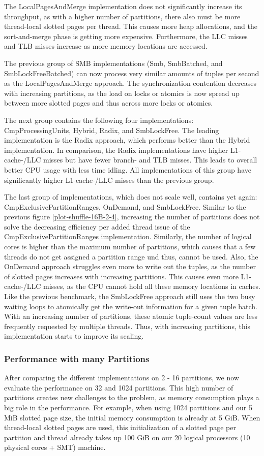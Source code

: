 The LocalPagesAndMerge implementation does not significantly increase its throughput, as with a higher number of partitions, there also must be more thread-local slotted pages per thread.
This causes more heap allocations, and the sort-and-merge phase is getting more expensive.
Furthermore, the \ac{LLC} misses and \ac{TLB} misses increase as more memory locations are accessed.

The previous group of SMB implementations (Smb, SmbBatched, and SmbLockFreeBatched) can now process very similar amounts of tuples per second as the LocalPagesAndMerge approach.
The synchronization contention decreases with increasing partitions, as the load on locks or atomics is now spread up between more slotted pages and thus across more locks or atomics.

The next group contains the following four implementations: CmpProcessingUnits, Hybrid, Radix, and SmbLockFree.
The leading implementation is the Radix approach, which performs better than the Hybrid implementation.
In comparison, the Radix implementations have higher L1-cache-/LLC misses but have fewer branch- and TLB misses.
This leads to overall better CPU usage with less time idling.
All implementations of this group have significantly higher L1-cache-/LLC misses than the previous group.

The last group of implementations, which does not scale well, contains yet again: CmpExclusivePartitionRanges, OnDemand, and SmbLockFree.
Similar to the previous figure \ref{plot-shuffle-16B-2-4}, increasing the number of partitions does not solve the decreasing efficiency per added thread issue of the CmpExclusivePartitionRanges implementation.
Similarly, the number of logical cores is higher than the maximum number of partitions, which causes that a few threads do not get assigned a partition range und thus, cannot be used.
Also, the OnDemand approach struggles even more to write out the tuples, as the number of slotted pages increases with increasing partitions.
This causes even more L1-cache-/LLC misses, as the \ac{CPU} cannot hold all these memory locations in caches.
Like the previous benchmark, the SmbLockFree approach still uses the two busy waiting loops to atomically get the write-out information for a given tuple batch.
With an increasing number of partitions, these atomic tuple-count values are less frequently requested by multiple threads.
Thus, with increasing partitions, this implementation starts to improve its scaling.
\subsubsection{Performance with many Partitions}
After comparing the different implementations on 2 - 16 partitions, we now evaluate the performance on 32 and 1024 partitions.
This high number of partitions creates new challenges to the problem, as memory consumption plays a big role in the performance.
For example, when using 1024 partitions and our 5 MiB slotted page size, the initial memory consumption is already at 5 GiB.
When thread-local slotted pages are used, this initialization of a slotted page per partition and thread already takes up 100 GiB on our 20 logical processors (10 physical cores + SMT) machine.

